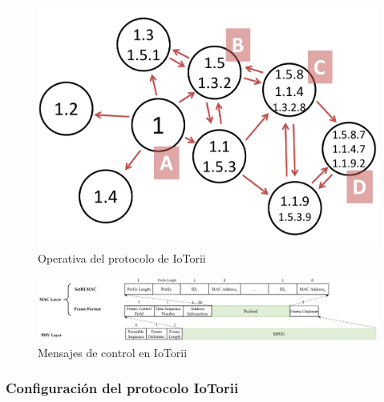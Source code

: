 \begin{figure}[ht!]
    \centering
    \includegraphics[width=\textwidth]{archivos/img/analisis/iotorii-operation.pdf}
    \caption{Operativa del protocolo de IoTorii \cite{rojas2021outperforming}}
    \label{fig:iotorii-operation}
\end{figure}



\begin{figure}
    \centering
    \includegraphics[width=\textwidth]{archivos/img/analisis/Comparation_frame_iotorii.eps}
    \caption{Mensajes de control en IoTorii \cite{rojas2021outperforming}}
    \label{fig:frameformat-setHLMAC}
\end{figure}


\subsubsection{Configuración del protocolo IoTorii}